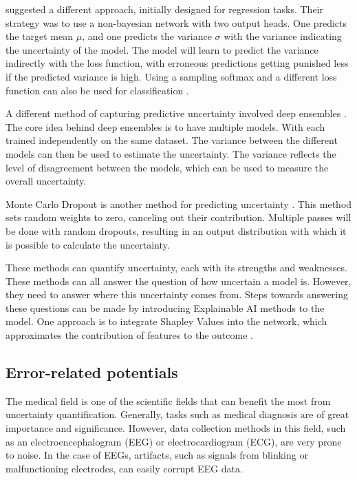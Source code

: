 \cite{nix1994estimating} suggested a different approach, initially designed for regression tasks. Their strategy was to use a non-bayesian network with two output heads. One predicts the target mean $\mu$, and one predicts the variance $\sigma$ with the variance indicating the uncertainty of the model. The model will learn to predict the variance indirectly with the loss function, with erroneous predictions getting punished less if the predicted variance is high. Using a sampling softmax and a different loss function can also be used for classification \citep{kendall2017uncertainties}.

A different method of capturing predictive uncertainty involved deep ensembles \citep{lakshminarayanan2017simple}. The core idea behind deep ensembles is to have multiple models. With each trained independently on the same dataset. The variance between the different models can then be used to estimate the uncertainty. The variance reflects the level of disagreement between the models, which can be used to measure the overall uncertainty.

Monte Carlo Dropout is another method for predicting uncertainty \citep{gal2016dropout}. This method sets random weights to zero, canceling out their contribution. Multiple passes will be done with random dropouts, resulting in an output distribution with which it is possible to calculate the uncertainty.

These methods can quantify uncertainty, each with its strengths and weaknesses. These methods can all answer the question of how uncertain a model is. However, they need to answer where this uncertainty comes from. Steps towards answering these questions can be made by introducing Explainable AI methods to the model. One approach is to integrate Shapley Values into the network, which approximates the contribution of features to the outcome \citep{merrick2020explanation}.

\subsection{Error-related potentials}

The medical field is one of the scientific fields that can benefit the most from uncertainty quantification. Generally, tasks such as medical diagnosis are of great importance and significance. However, data collection methods in this field, such as an electroencephalogram (EEG) or electrocardiogram  (ECG), are very prone to noise. In the case of EEGs, artifacts, such as signals from blinking or malfunctioning electrodes, can easily corrupt EEG data.


